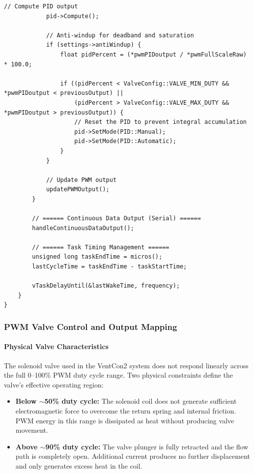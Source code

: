 \documentclass[12pt,a4paper]{article}
\begin{document}
\begin{lstlisting}[caption=Control Loop Implementation - Actual Code from ControlSystem.cpp]
            // Compute PID output
            pid->Compute();
            
            // Anti-windup for deadband and saturation
            if (settings->antiWindup) {
                float pidPercent = (*pwmPIDoutput / *pwmFullScaleRaw) * 100.0;
                
                if ((pidPercent < ValveConfig::VALVE_MIN_DUTY && *pwmPIDoutput < previousOutput) ||
                    (pidPercent > ValveConfig::VALVE_MAX_DUTY && *pwmPIDoutput > previousOutput)) {
                    // Reset the PID to prevent integral accumulation
                    pid->SetMode(PID::Manual);
                    pid->SetMode(PID::Automatic);
                }
            }
            
            // Update PWM output
            updatePWMOutput();
        }
        
        // ====== Continuous Data Output (Serial) ======
        handleContinuousDataOutput();
        
        // ====== Task Timing Management ======
        unsigned long taskEndTime = micros();
        lastCycleTime = taskEndTime - taskStartTime;
        
        vTaskDelayUntil(&lastWakeTime, frequency);
    }
}
\end{lstlisting}

\subsubsection{PWM Valve Control and Output Mapping}
\label{sec:valve-mapping}

\paragraph{Physical Valve Characteristics}
The solenoid valve used in the VentCon2 system does not respond linearly across the full 0--100\% PWM duty cycle range. Two physical constraints define the valve's effective operating region:

\begin{itemize}
    \item \textbf{Below $\sim$50\% duty cycle:} The solenoid coil does not generate sufficient electromagnetic force to overcome the return spring and internal friction. PWM energy in this range is dissipated as heat without producing valve movement.
    \item \textbf{Above $\sim$90\% duty cycle:} The valve plunger is fully retracted and the flow path is completely open. Additional current produces no further displacement and only generates excess heat in the coil.
\end{itemize}
\end{document}
